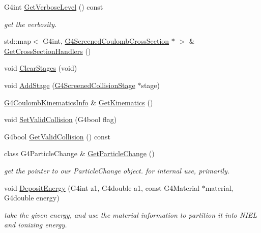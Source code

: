 \begin{DoxyCompactItemize}
G4int \hyperlink{classG4ScreenedNuclearRecoil_a1f1eb71aa90e9b9d83b3c2f082f404cb}{Get\+Verbose\+Level} () const 
\begin{DoxyCompactList}\small\item\em get the verbosity. \end{DoxyCompactList}\item 
std\+::map$<$ G4int, \hyperlink{classG4ScreenedCoulombCrossSection}{G4\+Screened\+Coulomb\+Cross\+Section} $\ast$ $>$ \& \hyperlink{classG4ScreenedNuclearRecoil_a35030d3bcb0af6a855d08f76c1a1c86f}{Get\+Cross\+Section\+Handlers} ()
\item 
void \hyperlink{classG4ScreenedNuclearRecoil_af480fe92eb5a8c80b38db068d4da7eb1}{Clear\+Stages} (void)
\item 
void \hyperlink{classG4ScreenedNuclearRecoil_aa6030349f3853422d0a27a836bfd7ca9}{Add\+Stage} (\hyperlink{classG4ScreenedCollisionStage}{G4\+Screened\+Collision\+Stage} $\ast$stage)
\item 
\hyperlink{structG4CoulombKinematicsInfo}{G4\+Coulomb\+Kinematics\+Info} \& \hyperlink{classG4ScreenedNuclearRecoil_a3ce5de95a63428383e130859d00ac7fa}{Get\+Kinematics} ()
\item 
void \hyperlink{classG4ScreenedNuclearRecoil_a75b348643f84ad9824bb4efc7d9dc860}{Set\+Valid\+Collision} (G4bool flag)
\item 
G4bool \hyperlink{classG4ScreenedNuclearRecoil_a5f1566375dfc829984e3f98e316e28ae}{Get\+Valid\+Collision} () const 
\item 
class G4\+Particle\+Change \& \hyperlink{classG4ScreenedNuclearRecoil_a06bd05510257f5ee6ad18d887a28926c}{Get\+Particle\+Change} ()
\begin{DoxyCompactList}\small\item\em get the pointer to our Particle\+Change object. for internal use, primarily. \end{DoxyCompactList}\item 
void \hyperlink{classG4ScreenedNuclearRecoil_ae0ab6a6c98402cbf573ebda97a21f529}{Deposit\+Energy} (G4int z1, G4double a1, const G4\+Material $\ast$material, G4double energy)
\begin{DoxyCompactList}\small\item\em take the given energy, and use the material information to partition it into N\+I\+EL and ionizing energy. \end{DoxyCompactList}\end{DoxyCompactItemize}
